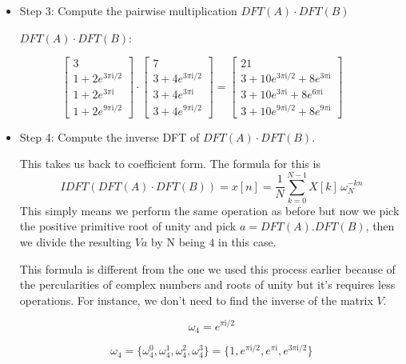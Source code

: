 \documentclass[11pt]{article}
\begin{document}
    \begin{itemize}
\item
  Step 3: Compute the pairwise multiplication \(DFT(A) \cdot DFT(B)\)

  \(DFT(A) \cdot DFT(B)\):
\end{itemize}

\[
     \begin{bmatrix} 3 
     \\ 1 + 2e^{{3\pi\mathrm{i}}/2} 
     \\ 1 + 2e^{3\pi\mathrm{i}} 
     \\ 1 + 2e^{{9\pi\mathrm{i}}/2}
     \end{bmatrix}
     \cdot
     \begin{bmatrix} 7 
     \\ 3 + 4e^{{3\pi\mathrm{i}}/2}
     \\ 3 + 4e^{3\pi\mathrm{i}} 
     \\ 3 + 4e^{{9\pi\mathrm{i}}/2} 
     \end{bmatrix}
     = 
     \begin{bmatrix}
     21
     \\ 3 + 10e^{{3\pi\mathrm{i}}/2} + 8e^{3\pi\mathrm{i}}
     \\ 3 + 10e^{3\pi\mathrm{i}} + 8e^{6\pi\mathrm{i}}
     \\ 3 + 10e^{{9\pi\mathrm{i}}/2} + 8e^{9\pi\mathrm{i}}
     \end{bmatrix}
\]

    \begin{itemize}
\item
  Step 4: Compute the inverse DFT of \(DFT(A) \cdot DFT(B)\).

  This takes us back to coefficient form. The formula for this is
  \[IDFT(DFT(A)\cdot DFT(B)) = x[n] = \frac{1}{N} \sum_{k=0}^{N-1} X[k]\, \omega_N^{-kn}\]
  This simply means we perform the same operation as before but now we
  pick the positive primitive root of unity and pick
  \(a = DFT(A).DFT(B)\), then we divide the resulting \(Va\) by N being
  \(4\) in this case.

  This formula is different from the one we used this process earlier
  because of the percularities of complex numbers and roots of unity but
  it's requires less operations. For instance, we don't need to find the
  inverse of the matrix \(V\).

  \[\omega_4 = e^{{\pi\mathrm{i}}/2}\]

  \[\omega_4 = \{ \omega_4^{0}, \omega_4^{1}, \omega_4^{2}, \omega_4^{3} \} = \{ 1, e^{{\pi\mathrm{i}}/2}, e^{\pi\mathrm{i}}, e^{{3\pi\mathrm{i}}/2} \}\]
\end{itemize}
\end{document}
